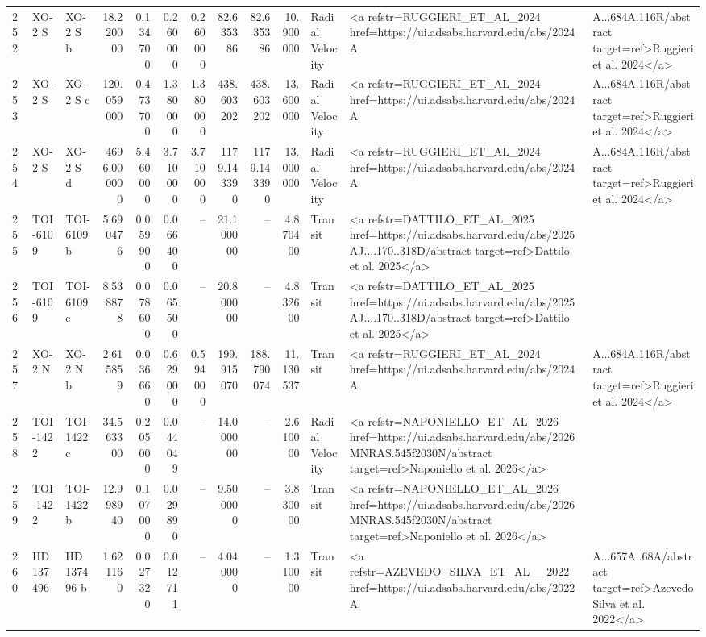 \begin{tabular}{lllrrrrrrrll}
252 & XO-2 S & XO-2 S b & 18.220000 & 0.134700 & 0.260000 & 0.260000 & 82.635386 & 82.635386 & 10.900000 & Radial Velocity & <a refstr=RUGGIERI_ET_AL_2024 href=https://ui.adsabs.harvard.edu/abs/2024A&A...684A.116R/abstract target=ref>Ruggieri et al. 2024</a> \\
253 & XO-2 S & XO-2 S c & 120.059000 & 0.473700 & 1.380000 & 1.380000 & 438.603202 & 438.603202 & 13.600000 & Radial Velocity & <a refstr=RUGGIERI_ET_AL_2024 href=https://ui.adsabs.harvard.edu/abs/2024A&A...684A.116R/abstract target=ref>Ruggieri et al. 2024</a> \\
254 & XO-2 S & XO-2 S d & 4696.000000 & 5.460000 & 3.710000 & 3.710000 & 1179.143390 & 1179.143390 & 13.000000 & Radial Velocity & <a refstr=RUGGIERI_ET_AL_2024 href=https://ui.adsabs.harvard.edu/abs/2024A&A...684A.116R/abstract target=ref>Ruggieri et al. 2024</a> \\
255 & TOI-6109 & TOI-6109 b & 5.690476 & 0.059900 & 0.066400 & -- & 21.100000 & -- & 4.870400 & Transit & <a refstr=DATTILO_ET_AL_2025 href=https://ui.adsabs.harvard.edu/abs/2025AJ....170..318D/abstract target=ref>Dattilo et al. 2025</a> \\
256 & TOI-6109 & TOI-6109 c & 8.538878 & 0.078600 & 0.065500 & -- & 20.800000 & -- & 4.832600 & Transit & <a refstr=DATTILO_ET_AL_2025 href=https://ui.adsabs.harvard.edu/abs/2025AJ....170..318D/abstract target=ref>Dattilo et al. 2025</a> \\
257 & XO-2 N & XO-2 N b & 2.615859 & 0.036660 & 0.629000 & 0.594000 & 199.915070 & 188.790074 & 11.130537 & Transit & <a refstr=RUGGIERI_ET_AL_2024 href=https://ui.adsabs.harvard.edu/abs/2024A&A...684A.116R/abstract target=ref>Ruggieri et al. 2024</a> \\
258 & TOI-1422 & TOI-1422 c & 34.563300 & 0.205000 & 0.044049 & -- & 14.000000 & -- & 2.610000 & Radial Velocity & <a refstr=NAPONIELLO_ET_AL_2026 href=https://ui.adsabs.harvard.edu/abs/2026MNRAS.545f2030N/abstract target=ref>Naponiello et al. 2026</a> \\
259 & TOI-1422 & TOI-1422 b & 12.998940 & 0.107000 & 0.029890 & -- & 9.500000 & -- & 3.830000 & Transit & <a refstr=NAPONIELLO_ET_AL_2026 href=https://ui.adsabs.harvard.edu/abs/2026MNRAS.545f2030N/abstract target=ref>Naponiello et al. 2026</a> \\
260 & HD 137496 & HD 137496 b & 1.621160 & 0.027320 & 0.012711 & -- & 4.040000 & -- & 1.310000 & Transit & <a refstr=AZEVEDO_SILVA_ET_AL__2022 href=https://ui.adsabs.harvard.edu/abs/2022A&A...657A..68A/abstract target=ref>Azevedo Silva et al. 2022</a> \\

\end{tabular}
